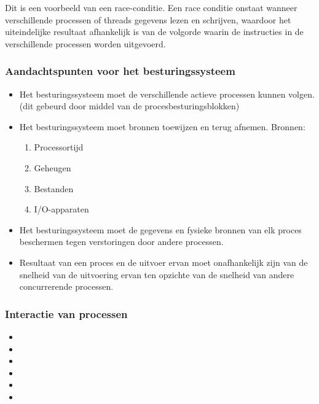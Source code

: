 Dit is een voorbeeld van een race-conditie. Een race conditie onstaat wanneer verschillende processen of threads gegevens lezen en schrijven, waardoor het uiteindelijke resultaat afhankelijk is van de volgorde waarin de instructies in de verschillende processen worden uitgevoerd.

\subsubsection{Aandachtspunten voor het besturingssysteem}

\begin{itemize}
    \item Het besturingssysteem moet de verschillende actieve processen kunnen volgen. (dit gebeurd door middel van de procesbesturingsblokken)
    \item 	Het besturingssysteem moet bronnen toewijzen en terug afnemen. Bronnen:
        \begin{enumerate}
        \item Processortijd
        \item Geheugen
        \item Bestanden
        \item I/O-apparaten
        \end{enumerate}
    \item Het besturingssysteem moet de gegevens en fysieke bronnen van elk proces beschermen tegen verstoringen door andere processen.
    \item Resultaat van een proces en de uitvoer ervan moet onafhankelijk zijn van de snelheid van de uitvoering ervan ten opzichte van de snelheid van andere concurrerende processen.

\end{itemize}

\subsubsection{Interactie van processen}

\begin{itemize}
\item 
\item 
\item 
\item 
\item 
\item 
\end{itemize}




